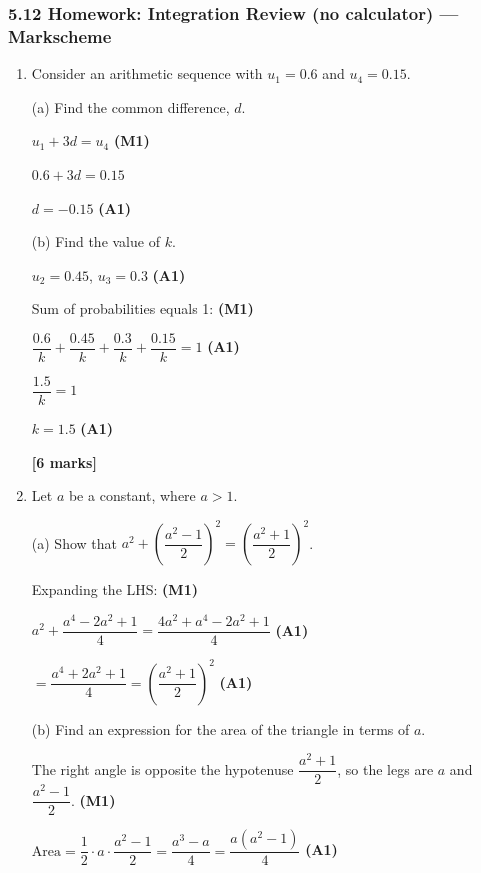\documentclass[12pt, twoside]{article}
\begin{document}
\subsubsection*{5.12 Homework: Integration Review (no calculator) --- Markscheme}

\begin{enumerate}[itemsep=0.4cm]

\item Consider an arithmetic sequence with $u_1 = 0.6$ and $u_4 = 0.15$.

(a) Find the common difference, $d$.

$u_1 + 3d = u_4$ \hfill \textbf{(M1)}

$0.6 + 3d = 0.15$

$d = -0.15$ \hfill \textbf{(A1)}

\medskip
(b) Find the value of $k$.

$u_2 = 0.45$, $u_3 = 0.3$ \hfill \textbf{(A1)}

Sum of probabilities equals 1: \hfill \textbf{(M1)}

$\dfrac{0.6}{k} + \dfrac{0.45}{k} + \dfrac{0.3}{k} + \dfrac{0.15}{k} = 1$ \hfill \textbf{(A1)}

$\dfrac{1.5}{k} = 1$

$k = 1.5$ \hfill \textbf{(A1)}

\textbf{[6 marks]}

\bigskip

\item Let $a$ be a constant, where $a > 1$.

(a) Show that $a^2 + \left(\dfrac{a^2 - 1}{2}\right)^2 = \left(\dfrac{a^2 + 1}{2}\right)^2$.

Expanding the LHS: \hfill \textbf{(M1)}

$a^2 + \dfrac{a^4 - 2a^2 + 1}{4} = \dfrac{4a^2 + a^4 - 2a^2 + 1}{4}$ \hfill \textbf{(A1)}

$= \dfrac{a^4 + 2a^2 + 1}{4} = \left(\dfrac{a^2 + 1}{2}\right)^2$ \hfill \textbf{(A1)}

\medskip
(b) Find an expression for the area of the triangle in terms of $a$.

The right angle is opposite the hypotenuse $\dfrac{a^2+1}{2}$, so the legs are $a$ and $\dfrac{a^2-1}{2}$. \hfill \textbf{(M1)}

$\text{Area} = \dfrac{1}{2} \cdot a \cdot \dfrac{a^2-1}{2} = \dfrac{a^3 - a}{4} = \dfrac{a(a^2 - 1)}{4}$ \hfill \textbf{(A1)}


\end{enumerate}
\end{document}
